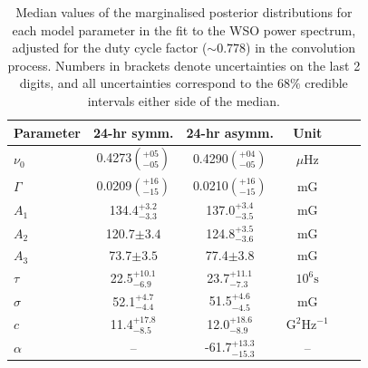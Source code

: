 \begin{table}[ht!]
	\begin{center}
		\caption{Median values of the marginalised posterior distributions for each model parameter in the fit to the WSO power spectrum, adjusted for the duty cycle factor ($\sim 0.778$) in the convolution process. Numbers in brackets denote uncertainties on the last 2 digits, and all uncertainties correspond to the $68 \%$ credible intervals either side of the median.}\label{tab:WSO_SMMF_fit_params}
		\begin{tabular}{l c c c c r}
			\hline
			{\bf Parameter} & {\bf 24-hr symm.} & {\bf 24-hr asymm.} & {\bf Unit} \\
			\hline
			
			{$\nu_0$} & {0.4273$\left(_{-05}^{+05}\right)$} & {0.4290$\left(_{-05}^{+04}\right)$} & {$\mu\mathrm{Hz} $}\\
			
			{$\Gamma$} & {0.0209$\left(_{-15}^{+16}\right)$} & {0.0210$\left(_{-15}^{+16}\right)$} & {$\mathrm{mG}$} \\
			
			{$A_1$} & {134.4$_{-3.3}^{+3.2}$} & {137.0$_{-3.5}^{+3.4}$} & {$\mathrm{mG}$} \\
			
			{$A_2$} & {120.7$\pm 3.4$} & {124.8$_{-3.6}^{+3.5}$} & {$\mathrm{mG}$} \\
			
			{$A_3$} & {73.7$\pm 3.5$} & {77.4$\pm 3.8$} & {$\mathrm{mG}$} \\
			
			{$\tau$} & {22.5$_{-6.9}^{+10.1}$} & {23.7$_{-7.3}^{+11.1}$} & {$10^6 \mathrm{s}$} \\	
			
			{$\sigma$} & {52.1$_{-4.4}^{+4.7}$} & {51.5$_{-4.5}^{+4.6}$} & {$\mathrm{mG}$} \\	
			
			{$c$} & {11.4$_{-8.5}^{+17.8}$} & {12.0$_{-8.9}^{+18.6}$} & {$\mathrm{G}^2\mathrm{Hz}^{-1}$} \\	
			
			{$\alpha$} & {--} & {-61.7$_{-15.3}^{+13.3}$} & {--} \\	
			\hline
		\end{tabular}
	\end{center}
\end{table}



